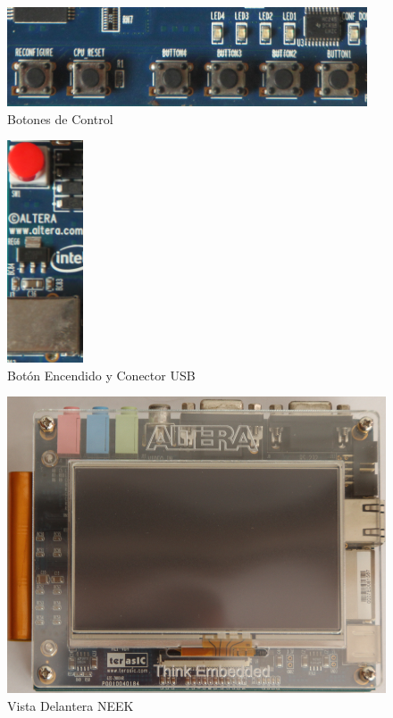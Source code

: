 \documentclass[a4paper,12pt,titlepage,final]{book}
\begin{document}
\begin{figure}[p]
\centering
\includegraphics[width=0.95\textwidth]{./figuras/NEEK/BotonesSetup.png}
\caption{Botones de Control}
\label{fig:botonescontrol}
\end{figure}

\begin{figure}[p]
\centering
\includegraphics[width=0.2\textwidth]{./figuras/NEEK/BotonPowerUSB.png}
\caption{Botón Encendido y Conector USB}
\label{fig:botonusb}
\end{figure}

\begin{figure}[p]
\centering
\includegraphics[width=\textwidth]{./figuras/NEEK/Delantera.png}
\caption{Vista Delantera NEEK}
\label{fig:delanteraneek}
\end{figure}
\end{document}
